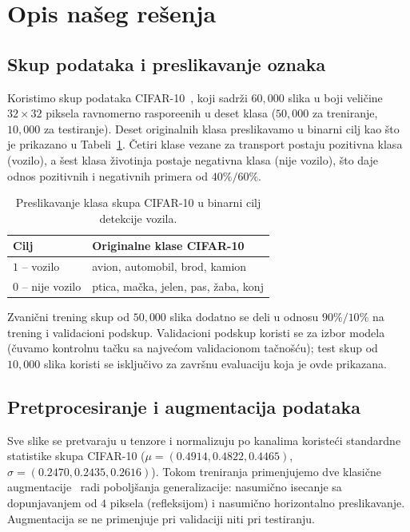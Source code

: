 \documentclass[11pt,a4paper]{article}
\begin{document}
\section{Opis na\v seg re\v senja}

\subsection{Skup podataka i preslikavanje oznaka}
Koristimo skup podataka CIFAR-10~\cite{krizhevsky2009learning}, koji sadr\v zi
$60{,}000$ slika u boji veli\v cine $32\times 32$ piksela ravnomerno
raspore\dj enih u deset klasa ($50{,}000$ za treniranje, $10{,}000$ za
testiranje). Deset originalnih klasa preslikavamo u binarni cilj kao \v sto je
prikazano u Tabeli~\ref{tab:mapping}. \v Cetiri klase vezane za transport
postaju pozitivna klasa (vozilo), a \v sest klasa \v zivotinja postaje negativna
klasa (nije vozilo), \v sto daje odnos pozitivnih i negativnih primera od
$40\%/60\%$.

\begin{table}[h]
\centering
\caption{Preslikavanje klasa skupa CIFAR-10 u binarni cilj detekcije vozila.}
\label{tab:mapping}
\begin{tabular}{ll}
\toprule
\textbf{Cilj} & \textbf{Originalne klase CIFAR-10} \\
\midrule
$1$ -- vozilo      & avion, automobil, brod, kamion \\
$0$ -- nije vozilo & ptica, ma\v cka, jelen, pas, \v zaba, konj \\
\bottomrule
\end{tabular}
\end{table}

Zvani\v cni trening skup od $50{,}000$ slika dodatno se deli u odnosu
$90\%/10\%$ na trening i validacioni podskup. Validacioni podskup koristi se za
izbor modela (\v cuvamo kontrolnu ta\v cku sa najve\'com validacionom
ta\v cno\v s\'cu); test skup od $10{,}000$ slika koristi se isklju\v civo za
zavr\v snu evaluaciju koja je ovde prikazana.

\subsection{Pretprocesiranje i augmentacija podataka}
Sve slike se pretvaraju u tenzore i normalizuju po kanalima koriste\'ci
standardne statistike skupa CIFAR-10 ($\mu = (0.4914, 0.4822, 0.4465)$,
$\sigma = (0.2470, 0.2435, 0.2616)$). Tokom treniranja primenjujemo dve
klasi\v cne augmentacije~\cite{krizhevsky2012imagenet} radi pobolj\v sanja
generalizacije: nasumi\v cno ise\-canje sa dopunjavanjem od $4$ piksela
(refleksijom) i nasumi\v cno horizontalno preslikavanje. Augmentacija se ne
primenjuje pri validaciji niti pri testiranju.
\end{document}

